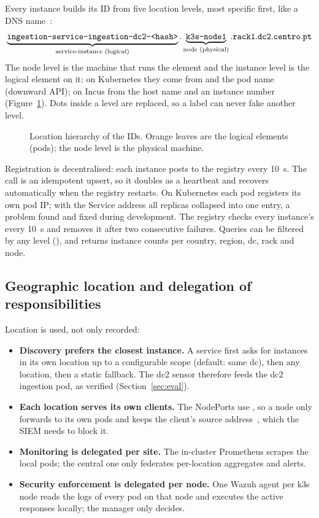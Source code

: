 Every instance builds its ID from five location levels, most specific first, like a DNS
name~\cite{rfc1034}:
\[
\underbrace{\texttt{ingestion-service-ingestion-dc2-<hash>}}_{\text{service-instance (logical)}}.
\underbrace{\texttt{k3s-node1}}_{\text{node (physical)}}.\texttt{rack1}.\texttt{dc2}.\texttt{centro}.\texttt{pt}
\]
The node level is the machine that runs the element and the instance level is the logical element
on it: on Kubernetes they come from  and the pod name (downward API); on Incus
from the host name and an instance number (Figure~\ref{fig:idtree}). Dots inside a level are
replaced, so a label can never fake another level.

\begin{figure}[ht]
\centering
\resizebox{0.85\textwidth}{!}{}
\caption{Location hierarchy of the IDs. Orange leaves are the logical elements (pods); the node
level is the physical machine.}
\label{fig:idtree}
\end{figure}

Registration is decentralised: each instance posts  to the
registry every 10~s. The call is an idempotent upsert, so it doubles as a heartbeat and recovers
automatically when the registry restarts. On Kubernetes each pod registers its own pod IP; with the
Service address all replicas collapsed into one entry, a problem found and fixed during development. The registry checks
every instance's  every 10~s and removes it after two consecutive failures. Queries
can be filtered by any level (), and  returns instance counts per
country, region, dc, rack and node.

\subsection{Geographic location and delegation of responsibilities}

Location is used, not only recorded:
\begin{itemize}
  \item \textbf{Discovery prefers the closest instance.} A service first asks for instances in its own
        location up to a configurable scope (default: same dc), then any location, then a static
        fallback. The dc2 sensor therefore feeds the dc2 ingestion pod, as verified
        (Section~\ref{sec:eval}).
  \item \textbf{Each location serves its own clients.} The NodePorts use
        , so a node only forwards to its own pods and keeps the
        client's source address~\cite{k8s_sourceip}, which the SIEM needs to block it.
  \item \textbf{Monitoring is delegated per site.} The in-cluster Prometheus scrapes the local pods;
        the central one only federates per-location aggregates and alerts.
  \item \textbf{Security enforcement is delegated per node.} One Wazuh agent per k3s node reads the
        logs of every pod on that node and executes the active responses locally; the manager only
        decides.
\end{itemize}

